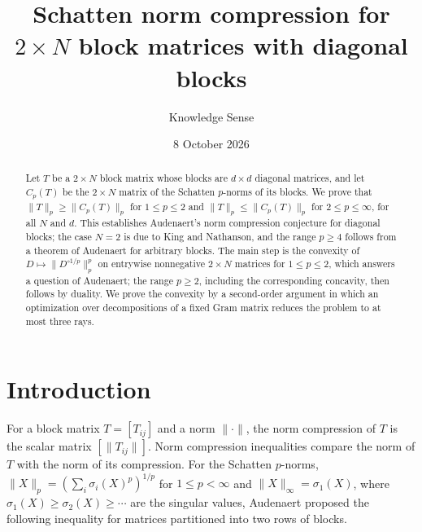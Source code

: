 \documentclass[11pt]{amsart}
\theoremstyle{definition}
\theoremstyle{remark}
\numberwithin{equation}{section}
\begin{document}
\title[Norm compression for diagonal blocks]{Schatten norm compression for $2\times N$ block matrices with diagonal blocks}

\author{Knowledge Sense}
\address{Knowledge Sense}

\date{8 October 2026}


\begin{abstract}
Let $T$ be a $2\times N$ block matrix whose blocks are $d\times d$ diagonal matrices, and let $C_p(T)$ be the $2\times N$ matrix of the Schatten $p$-norms of its blocks. We prove that $\|T\|_p\ge\|C_p(T)\|_p$ for $1\le p\le 2$ and $\|T\|_p\le\|C_p(T)\|_p$ for $2\le p\le\infty$, for all $N$ and $d$. This establishes Audenaert's norm compression conjecture for diagonal blocks; the case $N=2$ is due to King and Nathanson, and the range $p\ge4$ follows from a theorem of Audenaert for arbitrary blocks. The main step is the convexity of $D\mapsto\|D^{\circ 1/p}\|_p^p$ on entrywise nonnegative $2\times N$ matrices for $1\le p\le 2$, which answers a question of Audenaert; the range $p\ge2$, including the corresponding concavity, then follows by duality. We prove the convexity by a second-order argument in which an optimization over decompositions of a fixed Gram matrix reduces the problem to at most three rays.
\end{abstract}

\maketitle

\section{Introduction}

For a block matrix $T=[T_{ij}]$ and a norm $\|\cdot\|$, the norm compression of $T$ is the scalar matrix $[\|T_{ij}\|]$. Norm compression inequalities compare the norm of $T$ with the norm of its compression. For the Schatten $p$-norms, $\|X\|_p=(\sum_i\sigma_i(X)^p)^{1/p}$ for $1\le p<\infty$ and $\|X\|_\infty=\sigma_1(X)$, where $\sigma_1(X)\ge\sigma_2(X)\ge\cdots$ are the singular values, Audenaert proposed the following inequality for matrices partitioned into two rows of blocks.
\end{document}
